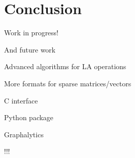 \section{Conclusion}

Work in progress!

And future work

Advanced algorithms for LA operations

More formats for sparse matrices/vectors

C interface

Python package

Graphalytics

!!!